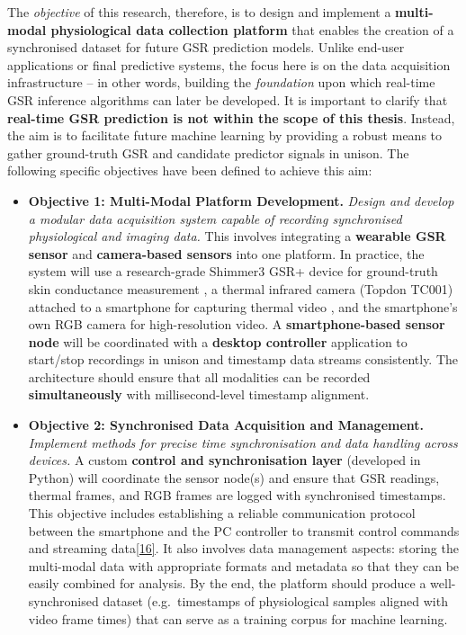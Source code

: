 \documentclass[12pt,a4paper]{article}
\begin{document}
The \emph{objective} of this research, therefore, is to design and implement a \textbf{multi-modal physiological data collection platform} that enables the creation of a synchronised dataset for future GSR prediction models. Unlike end-user applications or final predictive systems, the focus here is on the data acquisition infrastructure -- in other words, building the \emph{foundation} upon which real-time GSR inference algorithms can later be developed. It is important to clarify that \textbf{real-time GSR prediction is not within the scope of this thesis}. Instead, the aim is to facilitate future machine learning by providing a robust means to gather ground-truth GSR and candidate predictor signals in unison. The following specific objectives have been defined to achieve this aim:

\begin{itemize}
\item
  \textbf{Objective 1: Multi-Modal Platform Development.} \emph{Design and develop a modular data acquisition system capable of recording synchronised physiological and imaging data.} This involves integrating a \textbf{wearable GSR sensor} and \textbf{camera-based sensors} into one platform. In practice, the system will use a research-grade Shimmer3 GSR+ device for ground-truth skin conductance measurement \citep{ShimmerGSRSpecs}, a thermal infrared camera (Topdon TC001) attached to a smartphone for capturing thermal video \citep{TopdonTC001Specs}, and the smartphone's own RGB camera for high-resolution video. A \textbf{smartphone-based sensor node} will be coordinated with a \textbf{desktop controller} application to start/stop recordings in unison and timestamp data streams consistently. The architecture should ensure that all modalities can be recorded \textbf{simultaneously} with millisecond-level timestamp alignment.
\item
  \textbf{Objective 2: Synchronised Data Acquisition and Management.} \emph{Implement methods for precise time synchronisation and data handling across devices.} A custom \textbf{control and synchronisation layer} (developed in Python) will coordinate the sensor node(s) and ensure that GSR readings, thermal frames, and RGB frames are logged with synchronised timestamps. This objective includes establishing a reliable communication protocol between the smartphone and the PC controller to transmit control commands and streaming data\href{AndroidApp/README.md\#L2-L5}{{[}16{]}}. It also involves data management aspects: storing the multi-modal data with appropriate formats and metadata so that they can be easily combined for analysis. By the end, the platform should produce a well-synchronised dataset (e.g.~timestamps of physiological samples aligned with video frame times) that can serve as a training corpus for machine learning.

\end{itemize}
\end{document}
